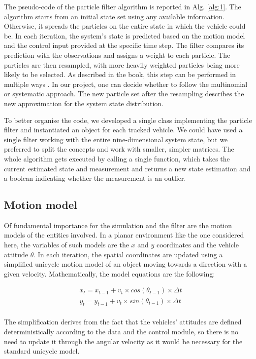 \documentclass[letterpaper,twocolumn,10pt]{article}
\begin{document}
The pseudo-code of the particle filter algorithm is reported in Alg. \autoref{alg:1}.
The algorithm starts from an initial state set using any available information. Otherwise, it spreads the particles on the entire state in which the vehicle could be. In each iteration, the system's state is predicted based on the motion model and the control input provided at the specific time step. The filter compares its prediction with the observations and assigns a weight to each particle. The particles are then resampled, with more heavily weighted particles being more likely to be selected. As described in the book, this step can be performed in multiple ways \cite{thrun2005probabilistic}. In our project, one can decide whether to follow the multinomial or systematic approach.  The new particle set after the resampling describes the new approximation for the system state distribution.

To better organise the code, we developed a single class implementing the particle filter and instantiated an object for each tracked vehicle. We could have used a single filter working with the entire nine-dimensional system state, but we preferred to split the concepts and work with smaller, simpler matrices. The whole algorithm gets executed by calling a single function, which takes the current estimated state and measurement and returns a new state estimation and a boolean indicating whether the measurement is an outlier. 

\subsection*{Motion model}
Of fundamental importance for the simulation and the filter are the motion models of the entities involved. In a planar environment like the one considered here, the variables of such models are the $x$ and $y$ coordinates and the vehicle attitude $\theta$. In each iteration, the spatial coordinates are updated using a simplified unicycle motion model of an object moving towards a direction with a given velocity. Mathematically, the model equations are the following:

\begin{align*}
& x_t = x_{t-1}+v_t\times cos(\theta_{t-1})\times \Delta t\\
& y_t = y_{t-1}+v_t\times sin(\theta_{t-1})\times \Delta t\\
\end{align*}

The simplification derives from the fact that the vehicles' attitudes are defined deterministically according to the data and the control module, so there is no need to update it through the angular velocity as it would be necessary for the standard unicycle model.
\end{document}
